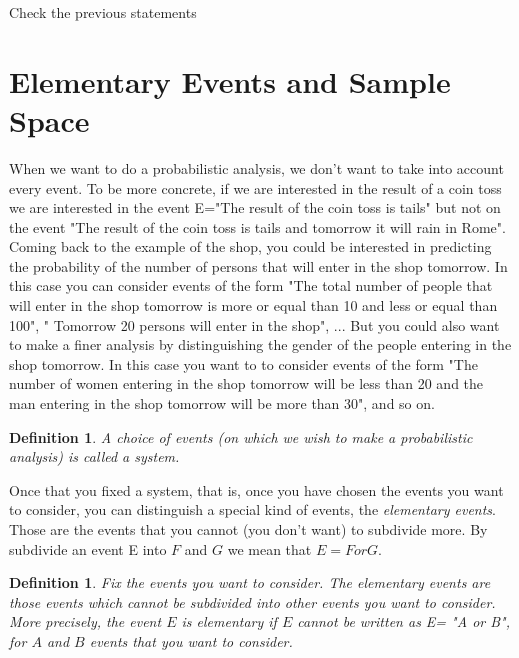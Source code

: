 \documentclass[reqno]{amsart}
\newtheorem{definition}[theorem]{Definition}
\newcommand{\<}{{\langle \!\! \langle}}
\renewcommand{\>}{{\rangle \!\! \rangle}}
\begin{document}
\begin{exercise}
Check the previous statements
\end{exercise}   
 

\section{Elementary Events and Sample Space}

When we want to do a probabilistic analysis, we don't want to take into account every event. To be more concrete, if we are interested in the result of a coin toss we are interested in the event E="The result of the coin toss is tails" but not on the event "The result of the coin toss is tails and tomorrow it will rain in Rome".\\
 Coming back to the example of the shop, you could be interested in predicting the probability of the number of persons that will enter in the shop tomorrow. In this case you can consider events of the form "The total number of people that will enter in the shop tomorrow is more or equal than 10 and less or equal than 100", " Tomorrow 20 persons will enter in the shop", ... But you could also  want to make a finer analysis by distinguishing the gender of the people entering in the shop tomorrow. In this case you want to to consider events of the form "The number of women entering in the shop tomorrow will be less than 20 and the man entering in the shop tomorrow will be more than 30", and so on.
\begin{definition}
A choice of events (on which we wish to make a probabilistic analysis) is called a system. 
\end{definition}

 Once that you fixed a system, that is, once you have chosen the events you want to consider, you can distinguish a special kind of events, the \emph{elementary events}. Those are the events that you cannot (you don't want) to subdivide more. By subdivide an event E into $F$ and $G$ we mean that $E= F or G$.\\  

\begin{definition}
Fix the events you want to consider. The elementary events are those events  which cannot be subdivided into other events you want to consider. More precisely, the event $E$ is elementary if $E$ cannot be written as E= "A or B", for $A$ and $B$ events that you want to consider.  
\end{definition}
\end{document}
